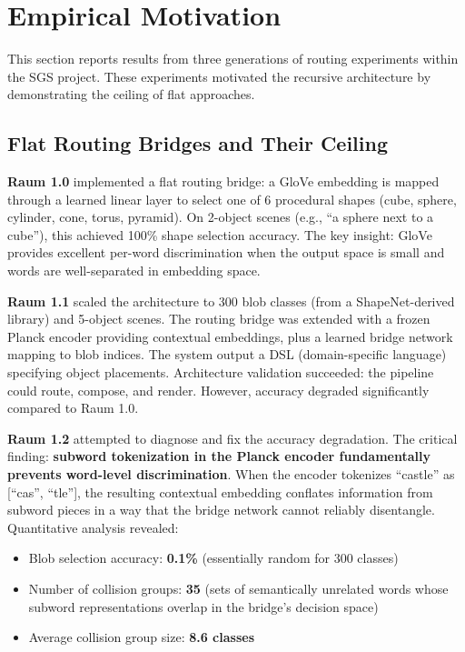 \documentclass[11pt]{article}
\begin{document}
\section{Empirical Motivation}

This section reports results from three generations of routing experiments within the SGS project. These experiments motivated the recursive architecture by demonstrating the ceiling of flat approaches.

\subsection{Flat Routing Bridges and Their Ceiling}

\textbf{Raum 1.0} implemented a flat routing bridge: a GloVe embedding is mapped through a learned linear layer to select one of 6 procedural shapes (cube, sphere, cylinder, cone, torus, pyramid). On 2-object scenes (e.g., ``a sphere next to a cube''), this achieved 100\% shape selection accuracy. The key insight: GloVe provides excellent per-word discrimination when the output space is small and words are well-separated in embedding space.

\textbf{Raum 1.1} scaled the architecture to 300 blob classes (from a ShapeNet-derived library) and 5-object scenes. The routing bridge was extended with a frozen Planck encoder providing contextual embeddings, plus a learned bridge network mapping to blob indices. The system output a DSL (domain-specific language) specifying object placements. Architecture validation succeeded: the pipeline could route, compose, and render. However, accuracy degraded significantly compared to Raum 1.0.

\textbf{Raum 1.2} attempted to diagnose and fix the accuracy degradation. The critical finding: \textbf{subword tokenization in the Planck encoder fundamentally prevents word-level discrimination}. When the encoder tokenizes ``castle'' as [``cas'', ``tle''], the resulting contextual embedding conflates information from subword pieces in a way that the bridge network cannot reliably disentangle. Quantitative analysis revealed:

\begin{itemize}
    \item Blob selection accuracy: \textbf{0.1\%} (essentially random for 300 classes)
    \item Number of collision groups: \textbf{35} (sets of semantically unrelated words whose subword representations overlap in the bridge's decision space)
    \item Average collision group size: \textbf{8.6 classes}
\end{itemize}
\end{document}
